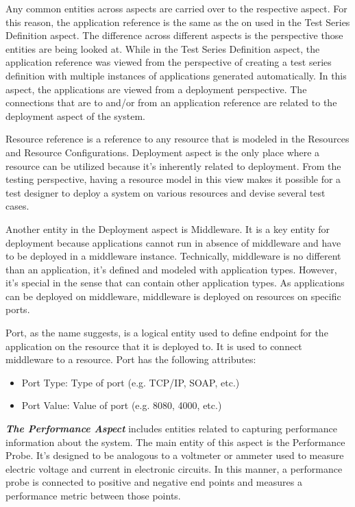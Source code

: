Any common entities across aspects are carried over to the respective aspect. For this reason, the application reference is the same as the on used in the Test Series Definition aspect. The difference across different aspects is the perspective those entities are being looked at. While in the Test Series Definition aspect, the application reference was viewed from the perspective of creating a test series definition with multiple instances of applications generated automatically. In this aspect, the applications are viewed from a deployment perspective. The connections that are to and/or from an application reference are related to the deployment aspect of the system. 

Resource reference is a reference to any resource that is modeled in the Resources and Resource Configurations. Deployment aspect is the only place where a resource can be utilized because it's inherently related to deployment. From the testing perspective, having a resource model in this view makes it possible for a test designer to deploy a system on various resources and devise several test cases.

Another entity in the Deployment aspect is Middleware. It is a key entity for deployment because applications cannot run in absence of middleware and have to be deployed in a middleware instance. Technically, middleware is no different than an application, it's defined and modeled with application types. However, it's special in the sense that can contain other application types. As applications can be deployed on middleware, middleware is deployed on resources on specific ports.

Port, as the name suggests, is a logical entity used to define endpoint for the application on the resource that it is deployed to. It is used to connect middleware to a resource. Port has the following attributes:

\begin{itemize}
	\item Port Type: Type of port (e.g. TCP/IP, SOAP, etc.)
	\item Port Value: Value of port (e.g. 8080, 4000, etc.)
\end{itemize}

\textit{\textbf{The Performance Aspect}} includes entities related to capturing performance information about the system. The main entity of this aspect is the Performance Probe. It's designed to be analogous to a voltmeter or ammeter used to measure electric voltage and current in electronic circuits. In this manner, a performance probe is connected to positive and negative end points and measures a performance metric between those points.

